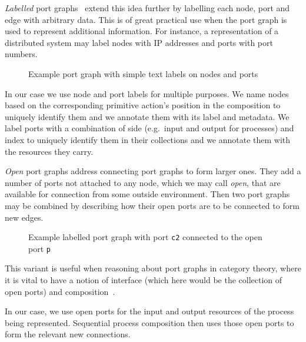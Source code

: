 \documentclass[class=smolathesis,crop=false]{standalone}
\begin{document}
\emph{Labelled} port graphs~\cite{fernandez_et_al-2019} extend this idea further by labelling each node, port and edge with arbitrary data.
This is of great practical use when the port graph is used to represent additional information.
For instance, a representation of a distributed system may label nodes with IP addresses and ports with port numbers.

\begin{figure}[htbp]
  \centering
  
  \caption{Example port graph with simple text labels on nodes and ports}
  \label{fig:pg_intro_lab}
\end{figure}

In our case we use node and port labels for multiple purposes.
We name nodes based on the corresponding primitive action's position in the composition to uniquely identify them and we annotate them with its label and metadata.
We label ports with a combination of side (e.g.\ input and output for processes) and index to uniquely identify them in their collections and we annotate them with the resources they carry.

\emph{Open} port graphs address connecting port graphs to form larger ones.
They add a number of ports not attached to any node, which we may call \emph{open}, that are available for connection from some outside environment.
Then two port graphs may be combined by describing how their open ports are to be connected to form new edges.

\begin{figure}[htbp]
  \centering
  
  \caption{Example labelled port graph with port \texttt{c2} connected to the open port \texttt{p}}
  \label{fig:pg_intro_open}
\end{figure}

This variant is useful when reasoning about port graphs in category theory, where it is vital to have a notion of interface (which here would be the collection of open ports) and composition~\cite{fong_spivak-2019}.

In our case, we use open ports for the input and output resources of the process being represented.
Sequential process composition then uses those open ports to form the relevant new connections.
\end{document}

